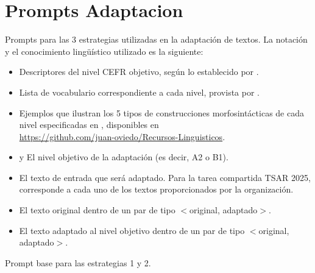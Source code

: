 \section{Prompts Adaptacion}\label{sec:ad_prompts}

Prompts para las 3 estrategias utilizadas en la adaptación de textos. La notación y el conocimiento lingüístico utilizado es la siguiente:

\begin{itemize}
    \item \prdescriptors Descriptores del nivel CEFR objetivo, según lo establecido por \parencite{CouncilEurope2020}.
    \item \prlist Lista de vocabulario correspondiente a cada nivel, provista por \parencite{Oxford3000}.
    \item \prgrammar Ejemplos que ilustran los 5 tipos de construcciones morfosintácticas de cada nivel especificadas en \parencite{North2010}, disponibles en \\\url{https://github.com/juan-oviedo/Recursos-Linguisticos}.
    \item \prlevel y \prcefrlevel El nivel objetivo de la adaptación (es decir, A2 o B1).
    \item \prinput El texto de entrada que será adaptado. Para la tarea compartida TSAR 2025, corresponde a cada uno de los textos proporcionados por la organización.
    \item \proriginaltext El texto original dentro de un par de tipo $<$original, adaptado$>$.
    \item \prsimplifiedtext El texto adaptado al nivel objetivo dentro de un par de tipo $<$original, adaptado$>$.
\end{itemize}

\begin{prompt}
{\label{fig:promptRun0}Prompt base para las estrategias 1 y 2.}
\end{prompt}

